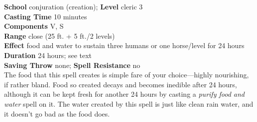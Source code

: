 \textbf{School} conjuration (creation); \textbf{Level} cleric 3\\
\textbf{Casting Time} 10 minutes\\
\textbf{Components} V, S\\
\textbf{Range} close (25 ft. + 5 ft./2 levels)\\
\textbf{Effect} food and water to sustain three humans or one horse/level for 24 hours\\
\textbf{Duration} 24 hours; see text\\
\textbf{Saving Throw} none; \textbf{Spell Resistance} no\\
The food that this spell creates is simple fare of your choice—highly nourishing, if rather bland. Food so created decays and becomes inedible after 24 hours, although it can be kept fresh for another 24 hours by casting a \textit{purify food and water }spell on it. The water created by this spell is just like clean rain water, and it doesn't go bad as the food does.\\
